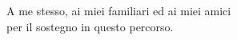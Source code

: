 \thispagestyle{empty}
\begin{flushright}

\vspace*{60mm}

A me stesso, ai miei familiari ed ai miei amici\\
per il sostegno in questo percorso.


\end{flushright}
